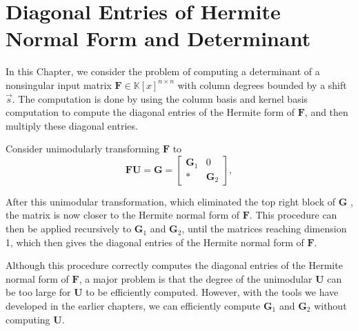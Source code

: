 
\chapter{\label{chap:determinant}Diagonal Entries of Hermite Normal Form
and Determinant}

In this Chapter, we consider the problem of computing a determinant
of a nonsingular input matrix $\mathbf{F}\in\mathbb{K}\left[x\right]^{n\times n}$
with column degrees bounded by a shift $\vec{s}$. The computation
is done by using the column basis and kernel basis computation to
compute the diagonal entries of the Hermite form of $\mathbf{F}$,
and then multiply these diagonal entries.

Consider unimodularly transforming $\mathbf{F}$ to 
\begin{equation}
\mathbf{F}\mathbf{U}=\mathbf{G}=\begin{bmatrix}\mathbf{G}_{1} & 0\\
* & \mathbf{G}_{2}
\end{bmatrix},\label{eq:step1HermiteDiagonal}
\end{equation}


 After this unimodular transformation, which eliminated the top
right block of $\mathbf{G}$ , the matrix is now closer to the Hermite
normal form of $\mathbf{F}$. This procedure can then be applied recursively
to $\mathbf{G}_{1}$ and $\mathbf{G}_{2}$, until the matrices reaching
dimension 1, which then gives the diagonal entries of the Hermite
normal form of $\mathbf{F}$.

Although this procedure correctly computes the diagonal entries of
the Hermite normal form of $\mathbf{F}$, a major problem is that
the degree of the unimodular $\mathbf{U}$ can be too large for $\mathbf{U}$
to be efficiently computed. However, with the tools we have developed
in the earlier chapters, we can efficiently compute $\mathbf{G}_{1}$
and $\mathbf{G}_{2}$ without computing $\mathbf{U}$.

